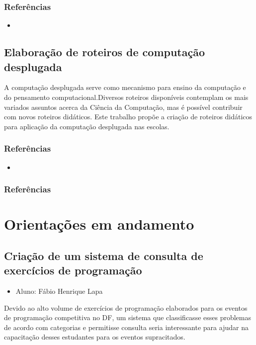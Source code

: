 \documentclass{article}
\newcommand*{\nsubsection}[1]{
    \subsection{#1}
}
\begin{document}
\subsubsection*{Referências}


\begin{itemize}
	\item {}
\end{itemize}



\nsubsection{Elaboração de roteiros de computação desplugada}

A computação desplugada serve como mecanismo para ensino da computação e do pensamento computacional.Diversos roteiros disponíveis contemplam os mais variados assuntos acerca da Ciência da Computação, mas é possível contribuir com novos roteiros didáticos. Este trabalho propõe a criação de roteiros didáticos para aplicação da computação desplugada nas escolas.

\subsubsection*{Referências}

\begin{itemize}
	\item {}
\end{itemize}


\subsubsection*{Referências}



\section{Orientações em andamento}



\nsubsection{Criação de um sistema de consulta de exercícios de programação}

\begin{itemize}
	\item Aluno: Fábio Henrique Lapa
\end{itemize}

Devido ao alto volume de exercícios de programação elaborados para os eventos de programação competitiva no DF, um sistema que classificasse esses problemas de acordo com categorias e permitisse consulta seria interessante para ajudar na capacitação desses estudantes para os eventos supracitados.
\end{document}
